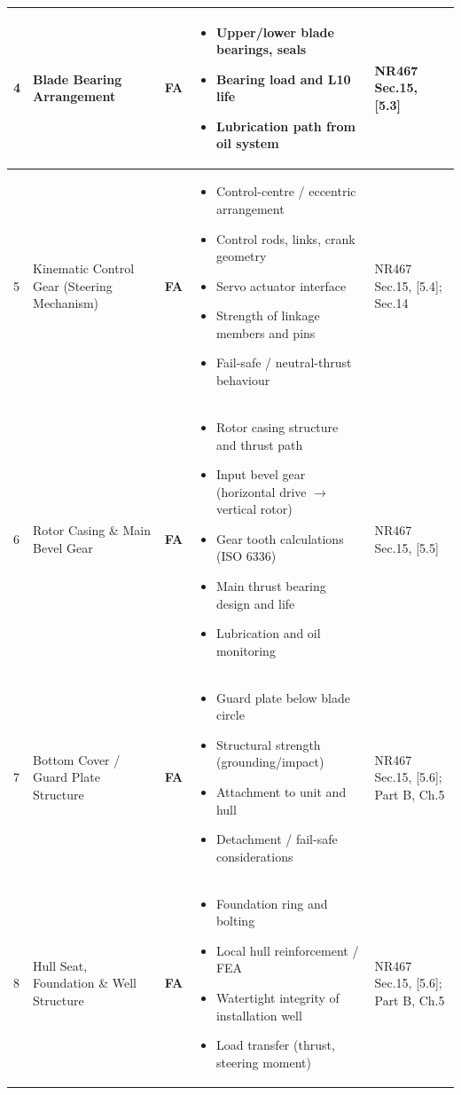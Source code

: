 \documentclass[11pt,a4paper]{report}
\newcommand{\fa}{\textbf{\textcolor{warningred}{FA}}}
\begin{document}
\begin{longtable}{|p{0.5cm}|p{5cm}|p{1.5cm}|p{5.5cm}|p{2cm}|}
4 & Blade Bearing Arrangement & \fa{} &
\begin{itemize}[leftmargin=*,nosep]
\item Upper/lower blade bearings, seals
\item Bearing load and L10 life
\item Lubrication path from oil system
\end{itemize} & NR467 Sec.15, [5.3] \\
\hline

5 & Kinematic Control Gear (Steering Mechanism) & \fa{} &
\begin{itemize}[leftmargin=*,nosep]
\item Control-centre / eccentric arrangement
\item Control rods, links, crank geometry
\item Servo actuator interface
\item Strength of linkage members and pins
\item Fail-safe / neutral-thrust behaviour
\end{itemize} & NR467 Sec.15, [5.4]; Sec.14 \\
\hline

6 & Rotor Casing \& Main Bevel Gear & \fa{} &
\begin{itemize}[leftmargin=*,nosep]
\item Rotor casing structure and thrust path
\item Input bevel gear (horizontal drive $\rightarrow$ vertical rotor)
\item Gear tooth calculations (ISO 6336)
\item Main thrust bearing design and life
\item Lubrication and oil monitoring
\end{itemize} & NR467 Sec.15, [5.5] \\
\hline

7 & Bottom Cover / Guard Plate Structure & \fa{} &
\begin{itemize}[leftmargin=*,nosep]
\item Guard plate below blade circle
\item Structural strength (grounding/impact)
\item Attachment to unit and hull
\item Detachment / fail-safe considerations
\end{itemize} & NR467 Sec.15, [5.6]; Part B, Ch.5 \\
\hline

8 & Hull Seat, Foundation \& Well Structure & \fa{} &
\begin{itemize}[leftmargin=*,nosep]
\item Foundation ring and bolting
\item Local hull reinforcement / FEA
\item Watertight integrity of installation well
\item Load transfer (thrust, steering moment)
\end{itemize} & NR467 Sec.15, [5.6]; Part B, Ch.5 \\
\hline


\end{longtable}
\end{document}
